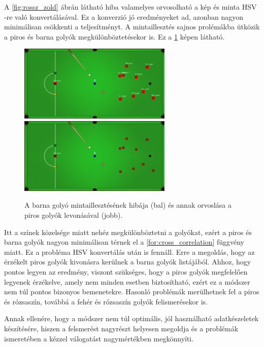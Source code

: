 \par A \ref{fig:rossz_zold} ábrán látható hiba valamelyes orvosolható a kép és minta HSV -re való konvertálásával. Ez a konverzió jó eredményeket ad, azonban nagyon minimálisan csökkenti a teljesítményt. A mintaillesztés sajnos prolémákba ütközik a piros és barna golyók megkülönböztetésekor is. Ez a \ref{fig:rossz_barna} képen látható.

\begin{figure}[!ht]
    \centering
    \includegraphics[width=73mm, keepaspectratio]{figures/wrong_brown.png}\hspace{2mm}
	\includegraphics[width=73mm, keepaspectratio]{figures/brown_ok.png}\\\vspace{5mm}
    \caption{A barna golyó mintaillesztésének hibája (bal) és annak orvoslása a piros golyók levonásával (jobb).}
    \label{fig:rossz_barna}
\end{figure}

\par Itt a színek közelsége miatt nehéz megkülönböztetni a golyókat, ezért a piros és barna golyók nagyon minimálisan térnek el a \ref{for:cross_correlation} függvény miatt. Ez a probléma HSV konvertálás után is fennáll. Erre a megoldás, hogy az érzékelt piros golyók kivonásra kerülnek a barna golyók listájából. Ahhoz, hogy pontos legyen az eredmény, viszont szükséges, hogy a piros golyók megfelelően legyenek érzékelve, amely nem minden esetben biztosítható, ezért ez a módszer nem túl pontos bizonyos bemenetekre. Hasonló problémák merülhetnek fel a piros és rózsaszín, továbbá a fehér és rózsaszín golyók felismerésekor is.
\par Annak ellenére, hogy a módszer nem túl optimális, jól használható adatkészeletek készítésére, hiszen a felsmerést nagyrészt helyesen megoldja és a problémák ismeretében a kézzel válogatást nagymértékben megkönnyíti.

